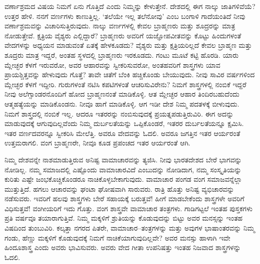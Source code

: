 ವರ್ಣಾಶ್ರಮದ ವಿಷಯ ನಿಮಗೆ ಏನು ಗೊತ್ತಿದೆ ಎಂದು ನಿಮ್ಮನ್ನು ಕೇಳುತ್ತೇನೆ. ದೇಶದಲ್ಲಿ ಈಗ ನಾಲ್ಕು ಜಾತಿಗಳಿವೆಯೆ? ಉತ್ತರ ಹೇಳಿ. ನನಗೆ ವರ್ಣಗಳು ಕಾಣುತ್ತಿಲ್ಲ. ‘ತಲೆಯೇ ಇಲ್ಲ ತಲೆನೋವು’ ಎಂಬ ಬಂಗಾಳಿ ಗಾದೆಯಂತಿದೆ ನೀವು ವರ್ಣಾಶ್ರಮವನ್ನು ವಿಚಾರಿಸುತ್ತಿರುವುದು. ನಾಲ್ಕು ವರ್ಣಗಳಲ್ಲಿ ಕೇವಲ ಬ್ರಾಹ್ಮಣರು ಮತ್ತು ಶೂದ್ರರನ್ನು ಮಾತ್ರ ನೋಡುತ್ತೇವೆ. ಕ್ಷತ್ರಿಯ ವೈಶ್ಯರು ಎಲ್ಲಿದ್ದಾರೆ? ಬ್ರಾಹ್ಮಣರು ಅವರಿಗೆ ಯಜ್ಞೋಪವೀತವನ್ನು ಕೊಟ್ಟು ಹಿಂದುಗಳಂತೆ ವೇದಗಳನ್ನು ಅಧ್ಯಯನ ಮಾಡುವಂತೆ ಏತಕ್ಕೆ ಹೇಳಕೂಡದು? ವೈಶ್ಯರು ಮತ್ತು ಕ್ಷತ್ರಿಯರಿಲ್ಲದೆ ಕೇವಲ ಬ್ರಾಹ್ಮಣ ಮತ್ತು ಶೂದ್ರರು ಮಾತ್ರ ಇದ್ದರೆ, ಅಂತಹ ಸ್ಥಳದಲ್ಲಿ ಬ್ರಾಹ್ಮಣರು ಇರಕೂಡದು. ಗಂಟು ಮೂಟೆ ಕಟ್ಟಿ ಹೊರಡಿ. ಯಾರು ಮ್ಲೇಚ್ಛರ ಕೆಳಗೆ ಇರುವರೋ, ಅವರ ಆಹಾರವನ್ನು ಸ್ವೀಕರಿಸುವರೋ, ಅಂತಹವರಿಗೆ ಶಾಸ್ತ್ರಗಳು ಯಾವ ಪ್ರಾಯಶ್ಚಿತ್ತವನ್ನು ಹೇಳುವುದು ಗೊತ್ತೆ? ತಾವೇ ಚಿತೆಗೆ ಬೆಂಕಿ ಹಚ್ಚಿಕೊಂಡು ಬೇಯುವುದು. ನೀವು ಸಾವಿರ ವರ್ಷಗಳಿಂದ ಮ್ಲೇಚ್ಛರ ಕೆಳಗೆ ಇದ್ದೀರಿ. ಗುರುಗಳಂತೆ ನಟಿಸಿ ಕಪಟಿಗಳಂತೆ ಆಚರಿಸುವಿರೇನು? ನಿಮಗೆ ಶಾಸ್ತ್ರಗಳಲ್ಲಿ ನಂಬಿಕೆ ಇದ್ದರೆ ನೀವು ಅಲೆಗ್ಸಾಂಡರನೊಂದಿಗೆ ಹೋದ ಬ್ರಾಹ್ಮಣನಂತೆ ಮಾಡಿಕೊಳ್ಳಿ. ಆತ ಮ್ಲೇಚ್ಛರ ಆಹಾರ ತಿಂದಿರಬಹುದೆಂದು ಆತ್ಮಹತ್ಯೆಯನ್ನು ಮಾಡಿಕೊಂಡನು. ನೀವೂ ಹಾಗೆ ಮಾಡಿಕೊಳ್ಳಿ. ಆಗ ಇಡೀ ದೇಶ ನಿಮ್ಮ ಪದತಳಕ್ಕೆ ಬೀಳುವುದು. ನಿಮಗೆ ಶಾಸ್ತ್ರದಲ್ಲಿ ನಂಬಿಕೆ ಇಲ್ಲ. ಆದರೂ ಇತರರನ್ನು ನಂಬಿಸುವುದಕ್ಕೆ ಪ್ರಯತ್ನಪಡುತ್ತಿರುವಿರಿ. ಈಗ ಅದನ್ನು ಮಾಡುವುದಕ್ಕೆ ಆಗುವುದಿಲ್ಲವೆಂದು ನಿಮ್ಮ ದುರ್ಬಲತೆಯನ್ನು ಒಪ್ಪಿಕೊಂಡರೆ, ಇತರರ ದುರ್ಬಲತೆಯನ್ನೂ ಕ್ಷಮಿಸಿ. ಇತರ ವರ್ಣದವರನ್ನೂ ಸ್ವೀಕರಿಸಿ ಮೇಲೆತ್ತಿ. ಅವರೂ ವೇದವನ್ನು ಓದಲಿ. ಅವರೂ ಜಗತ್ತಿನ ಇತರ ಆರ್ಯರಂತೆ ಉತ್ತಮರಾಗಲಿ. ವಂಗ ಬ್ರಾಹ್ಮಣರೇ, ನೀವೂ ಕೂಡ ಪ್ರಪಂಚದ ಇತರ ಆರ್ಯರಂತೆ ಆಗಿ.

ನಿಮ್ಮ ದೇಶವನ್ನೇ ನಾಶಮಾಡುತ್ತಿರುವ ಅನಿಷ್ಟ ವಾಮಾಚಾರವನ್ನು ತ್ಯಜಿಸಿ. ನೀವು ಭಾರತದೇಶದ ಬೇರೆ ಭಾಗವನ್ನು ನೋಡಿಲ್ಲ. ನಮ್ಮ ಸಮಾಜದಲ್ಲಿ ಎಷ್ಟೊಂದು ವಾಮಾಚಾರವಿದೆ ಎಂಬುದನ್ನು ನೋಡಿದಾಗ, ನಮ್ಮ ಸಂಸ್ಕೃತಿಯನ್ನು ಕುರಿತು ಎಷ್ಟೇ ಜಂಭಕೊಚ್ಚಿಕೊಂಡರೂ ನಾಚಿಕೊಳ್ಳಬೇಕಾಗುವುದು. ವಾಮಾಚಾರ ಪಂಗಡ ವಂಗ ಸಮಾಜವನ್ನೆಲ್ಲಾ ಮುತ್ತುತ್ತಿದೆ. ಹಗಲು ಆಚಾರವನ್ನು ಘಂಟಾ ಘೋಷವಾಗಿ ಸಾರುವರು. ರಾತ್ರಿ ಹೊತ್ತು ಅನಿಷ್ಟ ವ್ಯಭಿಚಾರವನ್ನು ನಡೆಸುವರು. ಇವರಿಗೆ ಹಲವು ಶಾಸ್ತ್ರಗಳು ಬೇರೆ ಸಹಾಯಕ್ಕೆ ಬರುತ್ತವೆ! ಹೀಗೆ ಮಾಡಬೇಕೆಂದು ಶಾಸ್ತ್ರಗಳೇ ಅವರಿಗೆ ವಿಧಿಸುತ್ತವೆ! ವಂಗೀಯರಿಗೆ ಇದು ಗೊತ್ತು. ವಂಗ ಶಾಸ್ತ್ರವೇ ವಾಮಾಚಾರ ತಂತ್ರಗಳು. ಗಾಡಿಗಟ್ಟಲೆ ಇಂತಹ ಪುಸ್ತಕಗಳು ಪ್ರತಿ ವರ್ಷವೂ ತಯಾರಾಗುತ್ತಿವೆ. ನಿಮ್ಮ ಮಕ್ಕಳಿಗೆ ಶ್ರುತಿಯನ್ನು ಕೊಡುವುದನ್ನು ಬಿಟ್ಟು ಅವರ ಮನಸ್ಸನ್ನು ಇಂತಹ ವಿಷದಿಂದ ತುಂಬುವಿರಿ. ಕಲ್ಕತ್ತಾ ನಗರದ ಪಿತರೇ, ವಾಮಾಚಾರ–ತಂತ್ರಗಳನ್ನು ಮತ್ತು ಅವುಗಳ ಭಾಷಾಂತರವನ್ನು ನಿಮ್ಮ ಗಂಡು, ಹೆಣ್ಣು ಮಕ್ಕಳಿಗೆ ಕೊಡುವುದಕ್ಕೆ ನಿಮಗೆ ನಾಚಿಕೆಯಾಗುವುದಿಲ್ಲವೇ? ಅವರ ಮನಸ್ಸು ಹಾಳಾಗಿ ಇವೇ ಹಿಂದೂಶಾಸ್ತ್ರ ಎಂದು ಅವರು ಭಾವಿಸುವರು. ಅವರು ವೇದ ಗೀತಾ ಉಪನಿಷತ್ತು ಇಂತಹ ನಿಜವಾದ ಶಾಸ್ತ್ರಗಳನ್ನು ಓದಲಿ.

